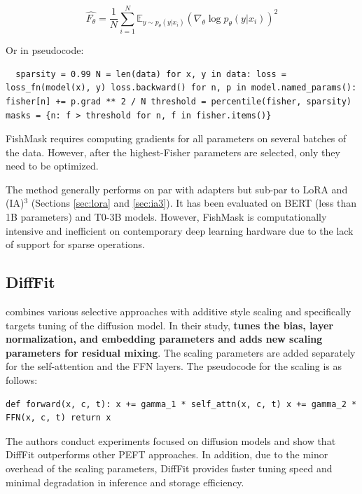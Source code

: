 \begin{equation*}
    \hat{F_{\theta}} = \frac{1}{N} \sum_{i = 1}^{N} \mathbb{E}_{y \sim p_{\theta}(y|x_i)}(\nabla_{\theta} \log p_{\theta}(y|x_i))^2
    \label{eqn:fisher_approximation}
\end{equation*}

Or in pseudocode:

\begin{lstlisting}
  sparsity = 0.99 N = len(data) for x, y in data: loss = loss_fn(model(x), y) loss.backward() for n, p in model.named_params(): fisher[n] += p.grad ** 2 / N threshold = percentile(fisher, sparsity) masks = {n: f > threshold for n, f in fisher.items()}
\end{lstlisting}

FishMask requires computing gradients for all parameters on several batches of the data. However, after the highest-Fisher parameters are selected, only they need to be optimized.

The method generally performs on par with adapters but sub-par to LoRA and (IA)$^3$ (Sections \ref{sec:lora} and \ref{sec:ia3}). It has been evaluated on BERT (less than 1B parameters) and T0-3B models. However, FishMask is computationally intensive and inefficient on contemporary deep learning hardware due to the lack of support for sparse operations.

\subsection{DiffFit}

\citet{xie2023difffit} combines various selective approaches with additive style scaling and specifically targets tuning of the diffusion model. In their study, \citet{xie2023difffit} \textbf{tunes the bias, layer normalization, and embedding parameters and adds new scaling parameters for residual mixing}. The scaling parameters are added separately for the self-attention and the FFN layers. The pseudocode for the scaling is as follows:

\begin{lstlisting}
def forward(x, c, t): x += gamma_1 * self_attn(x, c, t) x += gamma_2 * FFN(x, c, t) return x
\end{lstlisting}

The authors conduct experiments focused on diffusion models and show that DiffFit outperforms other PEFT approaches. In addition, due to the minor overhead of the scaling parameters, DiffFit provides faster tuning speed and minimal degradation in inference and storage efficiency.

